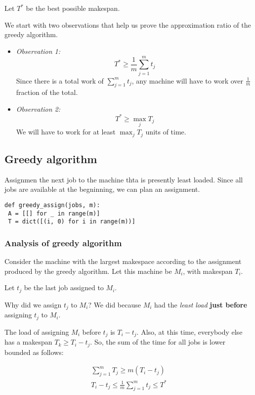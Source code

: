 Let $T^*$ be the best possible makespan.


We start with two observations that help us prove the approximation ratio
of the greedy algorithm.

\begin{itemize}
\item \textit{Observation 1:} $$T^* \geq \frac{1}{m} \sum_{j=1}^m t_j$$
Since there is a total work of $\sum_{j=1}^m t_j$, any machine will have
to work over $\frac{1}{m}$ fraction of the total.

\item \textit{Observation 2:} $$T^* \geq \max_j T_j$$
We will have to work for at least $\max_j T_j$ units of time.
\end{itemize}

\subsection{Greedy algorithm}
Assignmen the next job to the machine thta is presently least loaded. Since
all jobs are available at the begninning, we can plan an assignment.

\begin{verbatim}
def greedy_assign(jobs, m):
 A = [[] for _ in range(m)]
 T = dict([(i, 0) for i in range(m))]
\end{verbatim}

\subsubsection{Analysis of greedy algorithm}

Consider the machine with the largest makespace according to the assignment
produced by the greedy algorithm. Let this machine be $M_i$, with makespan $T_i$.

Let $t_j$ be the last job assigned to $M_i$.

Why did we assign $t_j$ to $M_i$? We did because $M_i$ had the \textit{least load}
\textbf{just before} assigning $t_j$ to $M_i$.

The load of assigning $M_i$ before $t_j$ is $T_i - t_j$. Also, at this time,
everybody else has a makespan $T_k \geq T_i - t_j$. So, the sum of the time
for all jobs is lower bounded as follows:

\begin{align*}
\sum_{j=1}^m T_j \geq m(T_i - t_j) \\
T_i - t_j \leq \frac{1}{m} \sum_{j=1}^m t_j \leq T^*
\end{align*}

